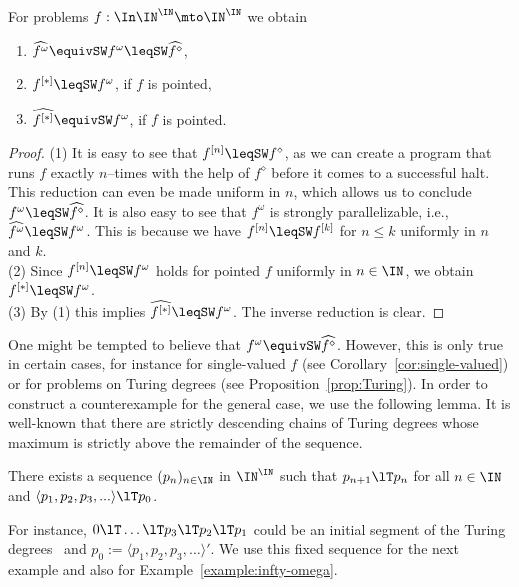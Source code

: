 \begin{prop}
\label{prop:omega}
For problems $f:\In\IN^\IN\mto\IN^\IN$ we obtain
\begin{enumerate}
\item $\widehat{f^\omega}\equivSW f^\omega\leqSW\widehat{f^\diamond}$,
\item $f^{[*]}\leqSW f^\omega$, if $f$ is pointed,
\item $\widehat{f^{[*]}}\equivSW f^\omega$, if $f$ is pointed.
\end{enumerate}
\end{prop}
\begin{proof}
(1) It is easy to see that $f^{[n]}\leqSW f^\diamond$, as we can create a program that runs $f$ exactly $n$--times with the help of $f^\diamond$ before it comes to a successful halt.
This reduction can even be made uniform in $n$, which allows us to conclude $f^\omega\leqSW\widehat{f^\diamond}$.
It is also easy to see that $f^\omega$ is strongly parallelizable, i.e., $\widehat{f^\omega}\leqSW f^\omega$. 
This is because we have $f^{[n]}\leqSW f^{[k]}$ for $n\leq k$ uniformly in $n$ and $k$.\\
(2) Since $f^{[n]}\leqSW f^\omega$ holds for pointed $f$ uniformly in $n\in\IN$, we obtain $f^{[*]}\leqSW f^\omega$.\\
(3) By (1) this implies $\widehat{f^{[*]}}\leqSW f^\omega$. The inverse reduction is clear.
\end{proof}

\noindent
One might be tempted to believe that $f^\omega\equivSW\widehat{f^\diamond}$. However, this is only true in certain cases,
for instance for single-valued $f$ (see Corollary~\ref{cor:single-valued}) or for problems on Turing degrees (see Proposition~\ref{prop:Turing}).
In order to construct a counterexample for the general case, we use the following lemma.
It is well-known that there are strictly descending chains of Turing degrees whose maximum is strictly above the remainder of the sequence.

\begin{lem}
\label{lem:Turing}
There exists a sequence $(p_n)_{n\in\IN}$ in $\IN^\IN$ such that 
$p_{n+1}\lT p_n$ for all $n\in\IN$ and $\langle p_1,p_2,p_3,...\rangle\lT p_0$.
\end{lem}

\noindent
For instance, $0\lT \dots\lT p_3\lT p_2\lT p_1$ could be an initial
segment of the Turing degrees~\cite{Hug69} and
$p_0:=\langle p_1,p_2,p_3,\dots\rangle'$.
We use this fixed sequence for the next example and also for Example~\ref{example:infty-omega}.

